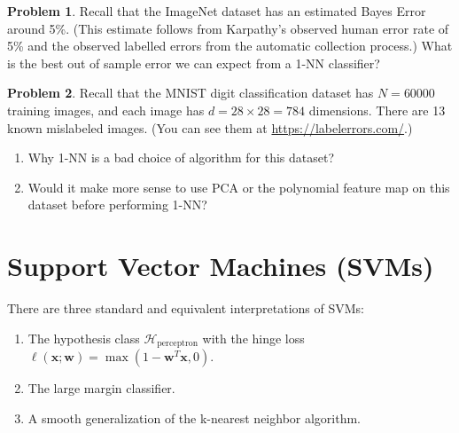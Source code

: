 \documentclass[10pt]{exam}
\theoremstyle{definition}
\newtheorem{problem}{Problem}
\newtheorem{note}{Note}
\newcommand{\trans}[1]{{#1}^{T}}
\newcommand{\loss}{\ell}
\newcommand{\w}{\mathbf w}
\newcommand{\x}{\mathbf x}
\newcommand{\HH}[1]{\mathcal H_{\text{#1}}}
\begin{document}
\newpage
\begin{problem}
    Recall that the ImageNet dataset has an estimated Bayes Error around 5\%.
    (This estimate follows from Karpathy's observed human error rate of 5\% and the observed labelled errors from the automatic collection process.)
    What is the best out of sample error we can expect from a 1-NN classifier?
\end{problem}

\vspace{3in}
\begin{problem}
    Recall that the MNIST digit classification dataset has $N=60000$ training images, and each image has $d=28\times28=784$ dimensions.
    There are 13 known mislabeled images.
    (You can see them at \url{https://labelerrors.com/}.)
    \begin{enumerate}
        \item Why 1-NN is a bad choice of algorithm for this dataset?
        \vspace{2in}
        \item Would it make more sense to use PCA or the polynomial feature map on this dataset before performing 1-NN?
    \end{enumerate}
\end{problem}

%

\newpage
\section*{Support Vector Machines (SVMs)}

There are three standard and equivalent interpretations of SVMs:
\begin{enumerate}
\item The hypothesis class $\HH{perceptron}$ with the hinge loss $\loss(\x;\w) = \max(1-\trans\w\x, 0)$.
\item The large margin classifier.
\item A smooth generalization of the k-nearest neighbor algorithm.
\end{enumerate}
\end{document}
